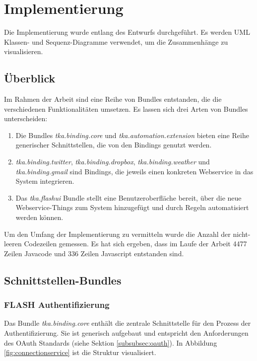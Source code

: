 \chapter{Implementierung}
Die Implementierung wurde entlang des Entwurfs durchgeführt. Es werden UML Klassen- und Sequenz-Diagramme verwendet, um die Zusammenhänge zu visualisieren.

\section{Überblick}
Im Rahmen der Arbeit sind eine Reihe von Bundles entstanden, die die verschiedenen Funktionalitäten umsetzen. Es lassen sich drei Arten von Bundles unterscheiden:
\begin{enumerate}
\item Die Bundles \textit{tka.binding.core} und \textit{tka.automation.extension} bieten eine Reihe generischer Schnittstellen, die von den Bindings genutzt werden.
\item \textit{tka.binding.twitter}, \textit{tka.binding.dropbox}, \textit{tka.binding.weather} und \textit{tka.binding.gmail} sind Bindings, die jeweils einen konkreten Webservice in das System integrieren. 
\item Das \textit{tka.flashui} Bundle stellt eine Benutzeroberfläche bereit, über die neue Webservice-Things zum System hinzugefügt und durch Regeln automatisiert werden können.
\end{enumerate}

Um den Umfang der Implementierung zu vermitteln wurde die Anzahl der nicht-leeren Codezeilen gemessen. Es hat sich ergeben, dass im Laufe der Arbeit 4477 Zeilen Javacode und 336 Zeilen Javascript entstanden sind. 


\section{Schnittstellen-Bundles}

\subsection{FLASH Authentifizierung}
\label{impl:core}
Das Bundle \textit{tka.binding.core} enthält die zentrale Schnittstelle für den Prozess der Authentifizierung. Sie ist generisch aufgebaut und entspricht den Anforderungen des OAuth Standards (siehe Sektion \ref{subsubsec:oauth}). In Abbildung \ref{fig:connectionservice} ist die Struktur visualisiert.

